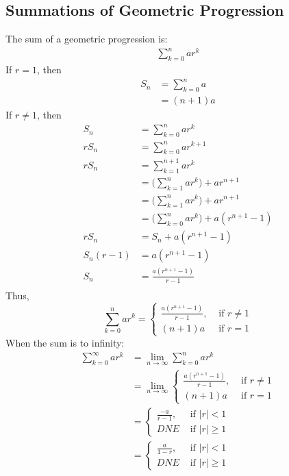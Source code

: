 \documentclass{article}
\theoremstyle{mytheoremstyle}
\theoremstyle{mytheoremstyle}
\theoremstyle{myproblemstyle}
\begin{document}
    \subsection*{Summations of Geometric Progression}
    The sum of a geometric progression is:
    \begin{align*}
        \sum_{k=0}^n ar^k
    \end{align*}
    If $r=1$, then
    \begin{align*}
        S_n &= \sum_{k=0}^n a \\
        &= (n+1)a
    \end{align*}
    If $r \ne 1$, then
    \begin{align*}
        S_n &= \sum_{k=0}^n ar^k \\
        rS_n &=\sum_{k=0}^n ar^{k+1} \\
        rS_n &=\sum_{k=1}^{n+1} ar^{k} \\
             &= \Big(\sum_{k=1}^{n} ar^{k}\Big) + ar^{n+1} \\
             &= \Big(\sum_{k=1}^{n} ar^{k}\Big) + ar^{n+1} \\
             &= \Big(\sum_{k=0}^{n} ar^{k}\Big) + a(r^{n+1} - 1) \\
        rS_n &= S_n + a(r^{n+1} - 1) \\
        S_n (r - 1) &= a(r^{n+1} - 1) \\
        S_n  &= \frac{a(r^{n+1} - 1)}{r - 1} \\
    \end{align*}
    Thus,
    \[
        \sum_{k=0}^n ar^k = \begin{cases}
            \frac{a(r^{n+1} - 1)}{r - 1}, &\text{ if } r\ne 1\\
            (n+1)a &\text{ if } r = 1
        \end{cases}
    \]
    When the sum is to infinity:
    \begin{align*}
        \sum_{k=0}^\infty ar^k
        &= \lim_{n\to \infty} \sum_{k=0}^n ar^k \\
        &= \lim_{n\to \infty} \begin{cases}
            \frac{a(r^{n+1} - 1)}{r - 1}, &\text{ if } r\ne 1\\
            (n+1)a &\text{ if } r = 1
        \end{cases} \\
        &= \begin{cases}
            \frac{-a}{r - 1}, &\text{ if } |r| < 1 \\
            DNE &\text{ if } |r| \ge 1
        \end{cases} \\
        &= \begin{cases}
            \frac{a}{1 - r}, &\text{ if } |r| < 1 \\
            DNE &\text{ if } |r| \ge 1
        \end{cases}
    \end{align*}
\end{document}
